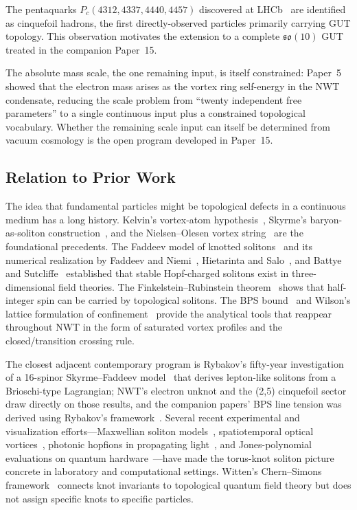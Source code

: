 \documentclass[11pt]{article}
\newcommand{\so}{\mathfrak{so}}
\begin{document}
The pentaquarks $P_c(4312, 4337, 4440, 4457)$ discovered at
LHCb~\cite{LHCbPc2019} are identified as cinquefoil hadrons, the
first directly-observed particles primarily carrying GUT topology.  This observation
motivates the extension to a complete $\so(10)$ GUT treated in the
companion Paper~15.

The absolute mass scale, the one remaining input, is itself
constrained: Paper~5~\cite{NWT5} showed that the electron mass
arises as the vortex ring self-energy in the NWT condensate,
reducing the scale problem from ``twenty independent free
parameters'' to a single continuous input plus a constrained
topological vocabulary.  Whether the remaining scale input can
itself be determined from vacuum cosmology is the open program
developed in Paper~15.

\subsection{Relation to Prior Work}
\label{sec:prior-art}

The idea that fundamental particles might be topological defects
in a continuous medium has a long history.  Kelvin's vortex-atom
hypothesis~\cite{Kelvin1867}, Skyrme's baryon-as-soliton
construction~\cite{Skyrme1961}, and the Nielsen--Olesen vortex
string~\cite{NielsenOlesen1973} are the foundational precedents.
The Faddeev model of knotted solitons~\cite{Faddeev1975} and its
numerical realization by Faddeev and
Niemi~\cite{FaddeevNiemi1997}, Hietarinta and
Salo~\cite{HietarintaSalo1999}, and Battye and
Sutcliffe~\cite{BattyeSutcliffe2002} established that stable
Hopf-charged solitons exist in three-dimensional field theories.
The Finkelstein--Rubinstein theorem~\cite{FinkelsteinRubinstein1968}
shows that half-integer spin can be carried by topological
solitons.  The BPS bound~\cite{Bogomolny1976} and
Wilson's lattice formulation of
confinement~\cite{Wilson1974} provide the analytical tools that
reappear throughout NWT in the form of saturated vortex
profiles and the closed/transition crossing rule.

The closest adjacent contemporary program is Rybakov's fifty-year
investigation of a 16-spinor Skyrme--Faddeev
model~\cite{Rybakov2015,Rybakov2016,Rybakov2025} that derives
lepton-like solitons from a Brioschi-type Lagrangian; NWT's
electron unknot and the (2,5) cinquefoil sector draw directly on
those results, and the companion papers' BPS line tension was
derived using Rybakov's framework~\cite{NWT11,NWT12}.  Several
recent experimental and visualization efforts---Maxwellian
soliton models~\cite{Vrba2022}, spatiotemporal optical
vortices~\cite{Jhajj2016}, photonic hopfions in propagating
light~\cite{Shen2023}, and Jones-polynomial evaluations on
quantum hardware~\cite{Meichanetzidis2025}---have made the
torus-knot soliton picture concrete in laboratory and
computational settings.  Witten's Chern--Simons
framework~\cite{Witten1989} connects knot invariants to
topological quantum field theory but does not assign specific
knots to specific particles.
\end{document}

